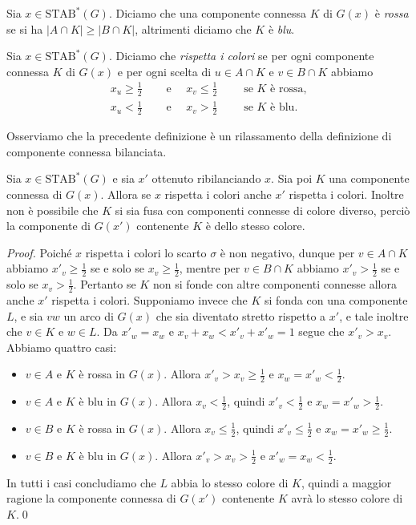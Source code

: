 \begin{definition}
	Sia \(x\in\text{STAB}^{*}(G)\). Diciamo che una componente connessa \(K\) di \(G(x)\) è \emph{rossa} se si ha \(|A\cap K|\ge|B\cap K|\), altrimenti diciamo che \(K\) è \emph{blu}. 
\end{definition}
\begin{definition}
	Sia \(x\in\text{STAB}^{*}(G)\). Diciamo che \emph{rispetta i colori} se per ogni componente connessa \(K\) di \(G(x)\) e per ogni scelta di \(u\in A\cap K\) e \(v\in B\cap K\) abbiamo 
	\begin{align}
		x_u\ge\frac{1}{2}&\quad\text{ e }\quad x_v\le\frac{1}{2}\qquad\text{ se }K\text{ \`e rossa,} \nonumber \\
		x_u<\frac{1}{2}&\quad\text{ e }\quad x_v>\frac{1}{2}\qquad\text{ se }K\text{ \`e blu.} \nonumber 
	\end{align}
\end{definition}
Osserviamo che la precedente definizione è un rilassamento della definizione di componente connessa bilanciata. 
\begin{lemma}
	\label{consistentlemma} Sia \(x\in\text{STAB}^{*}(G)\) e sia \(x'\) ottenuto ribilanciando \(x\). Sia poi \(K\) una componente connessa di \(G(x)\). Allora se \(x\) rispetta i colori anche \(x'\) rispetta i colori. Inoltre non è possibile che \(K\) si sia fusa con componenti connesse di colore diverso, perciò la componente di \(G(x')\) contenente \(K\) è dello stesso colore. 
\end{lemma}
\begin{proof}
	Poich\'e \(x\) rispetta i colori lo scarto \(\sigma\) \`e non negativo, dunque per \(v\in A\cap K\) abbiamo \(x'_v\ge \frac{1}{2}\) se e solo se \(x_v\ge \frac{1}{2}\), mentre per \(v\in B\cap K\) abbiamo \(x'_v>\frac{1}{2}\) se e solo se \(x_v>\frac{1}{2}\). Pertanto se \(K\) non si fonde con altre componenti connesse allora anche \(x'\) rispetta i colori. Supponiamo invece che \(K\) si fonda con una componente \(L\), e sia \(vw\) un arco di \(G(x)\) che sia diventato stretto rispetto a \(x'\), e tale inoltre che \(v\in K\) e \(w\in L\). Da \(x'_w=x_w\) e \(x_v+x_w < x'_v+x'_w = 1\) segue che \(x'_v > x_v\). Abbiamo quattro casi: 
	\begin{itemize}
		\item \(v\in A\) e \(K\) \`e rossa in \(G(x)\). Allora \(x'_v>x_v\ge\frac{1}{2}\) e \(x_w=x'_w<\frac{1}{2}\). 
		\item \(v\in A\) e \(K\) \`e blu in \(G(x)\). Allora \(x_v<\frac{1}{2}\), quindi \(x'_v<\frac{1}{2}\) e \(x_w=x'_w>\frac{1}{2}\). 
		\item \(v\in B\) e \(K\) \`e rossa in \(G(x)\). Allora \(x_v\le\frac{1}{2}\), quindi \(x'_v\le\frac{1}{2}\) e \(x_w=x'_w\ge\frac{1}{2}\). 
		\item \(v\in B\) e \(K\) \`e blu in \(G(x)\). Allora \(x'_v>x_v>\frac{1}{2}\) e \(x'_w=x_w<\frac{1}{2}\). 
	\end{itemize}
	In tutti i casi concludiamo che \(L\) abbia lo stesso colore di \(K\), quindi a maggior ragione la componente connessa di \(G(x')\) contenente \(K\) avr\`a lo stesso colore di \(K\).\qed 
\end{proof}
